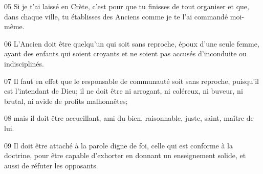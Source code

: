
05 Si je t’ai laissé en Crète, c’est pour que tu finisses de tout organiser et que, dans chaque ville, tu établisses des Anciens comme je te l’ai commandé moi-même.

06 L’Ancien doit être quelqu’un qui soit sans reproche, époux d’une seule femme, ayant des enfants qui soient croyants et ne soient pas accusés d’inconduite ou indisciplinés.

07 Il faut en effet que le responsable de communauté soit sans reproche, puisqu’il est l’intendant de Dieu; il ne doit être ni arrogant, ni coléreux, ni buveur, ni brutal, ni avide de profits malhonnêtes;

08 mais il doit être accueillant, ami du bien, raisonnable, juste, saint, maître de lui.

09 Il doit être attaché à la parole digne de foi, celle qui est conforme à la doctrine, pour être capable d’exhorter en donnant un enseignement solide, et aussi de réfuter les opposants.
